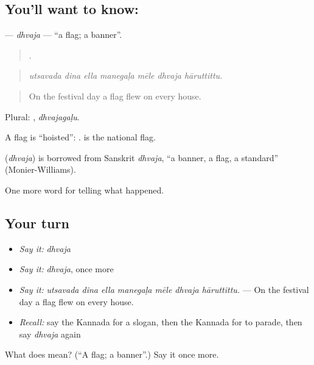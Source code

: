 \subsection*{You'll want to know: }
\textbf{} — \emph{dhvaja} — \textquotedblleft{}a flag; a banner\textquotedblright{}.

\begin{quote}
      .
\end{quote}

\begin{quote}
\emph{utsavada dina ella manegaḷa mēle dhvaja hāruttittu.}
\end{quote}

\begin{quote}
On the festival day a flag flew on every house.
\end{quote}

Plural: , \emph{dhvajagaḷu}.

A flag is \textquotedblleft{}hoisted\textquotedblright{}:  .  is the national flag.

\begin{cousinweb}
\textbf{} (\emph{dhvaja}) is borrowed from Sanskrit \emph{dhvaja}, \textquotedblleft{}a banner, a flag, a standard\textquotedblright{} (Monier-Williams).
\end{cousinweb}

\begin{grammarlens}[title={What you've built}]
One more word for telling what happened.
\end{grammarlens}

\subsection*{Your turn}
\begin{itemize}
\raggedright
  \item \emph{Say it:} \emph{dhvaja}
  \item \emph{Say it:} \emph{dhvaja}, once more
  \item \emph{Say it:} \emph{utsavada dina ella manegaḷa mēle dhvaja hāruttittu.} — On the festival day a flag flew on every house.
  \item \emph{Recall:} say the Kannada for a slogan, then the Kannada for to parade, then say \emph{dhvaja} again
\end{itemize}

\begin{tcolorbox}[breakable,colback=teal!4,colframe=teal!35!black,title={Before you move on}]
What does  mean? (\textquotedblleft{}A flag; a banner\textquotedblright{}.) Say it once more.
\end{tcolorbox}
